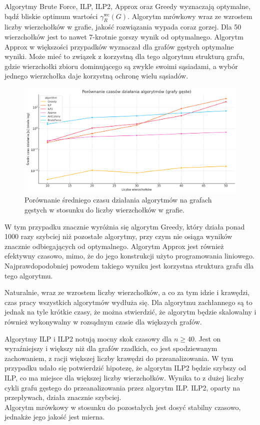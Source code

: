     Algorytmy Brute Force, ILP, ILP2, Approx oraz Greedy wyznaczają optymalne, bądź bliskie optimum wartości $\gamma^{\text{wc}}_R(G)$. Algorytm mrówkowy wraz ze wzrostem liczby wierzchołków w grafie, jakość rozwiązania wypada coraz gorzej. Dla 50 wierzchołków jest to nawet 7-krotnie gorszy wynik od optymalnego. Algorytm Approx w większości przypadków wyznaczał dla grafów gęstych optymalne wyniki. Może mieć to związek z korzystną dla tego algorytmu strukturą grafu, gdzie wierzchołki zbioru dominującego są zwykle swoimi sąsiadami, a wybór jednego wierzchołka daje korzystną ochronę wielu sąsiadów.

    \begin{figure}[H]
        \centering
        \includegraphics[width=\textwidth]{assets/dense.png}
        \caption{Porównanie średniego czasu działania algorytmów na grafach gęstych w stosunku do liczby wierzchołków w grafie.}
        \label{fig:densePlot}
    \end{figure}

    W tym przypadku znacznie wyróżnia się algorytm Greedy, który działa ponad 1000 razy szybciej niż pozostałe algorytmy, przy czym nie osiąga wyników znacznie odbiegających od optymalnego. Algorytm Approx jest również efektywny czasowo, mimo, że do jego konstrukcji użyto programowania liniowego. Najprawdopodobniej powodem takiego wyniku jest korzystna struktura grafu dla tego algorytmu.

    Naturalnie, wraz ze wzrostem liczby wierzchołków, a co za tym idzie i krawędzi, czas pracy wszystkich algorytmów wydłuża się. Dla algorytmu zachłannego są to jednak na tyle krótkie czasy, że można stwierdzić, że algorytm będzie skalowalny i również wykonywalny w rozsądnym czasie dla większych grafów.

    Algorytmy ILP i ILP2 notują mocny skok czasowy dla $n \geq 40 $. Jest on wyraźniejszy i większy niż dla grafów rzadkich, co jest spodziewanym zachowaniem, z racji większej liczby krawędzi do przeanalizowania. W tym przypadku udało się potwierdzić hipotezę, że algorytm ILP2 będzie szybszy od ILP, co ma miejsce dla większej liczby wierzchołków. Wynika to z dużej liczby cykli grafu gęstego do przeanalizowania przez algorytm ILP. ILP2, oparty na przepływach, działa znacznie szybciej. \\
    Algorytm mrówkowy w stosunku do pozostałych jest dosyć stabilny czasowo, jednakże jego jakość jest mierna.\\
    

